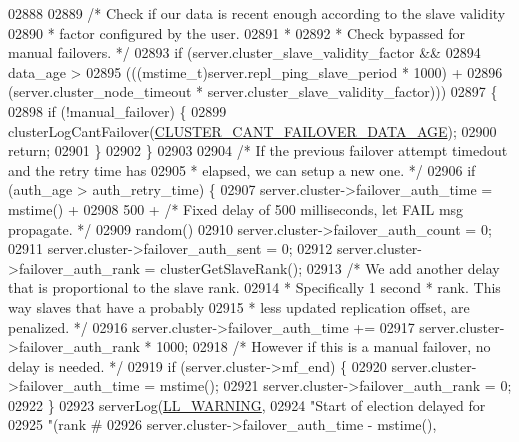 \begin{DoxyCode}
{{{{{{{{{{{{{{{{{{{{{{{{{{{{{{{{{{{{{{{{{{{{{{{{{{{02888 
02889     \textcolor{comment}{/* Check if our data is recent enough according to the slave validity}
02890 \textcolor{comment}{     * factor configured by the user.}
02891 \textcolor{comment}{     *}
02892 \textcolor{comment}{     * Check bypassed for manual failovers. */}
02893     \textcolor{keywordflow}{if} (server.cluster\_slave\_validity\_factor &&
02894         data\_age >
02895         (((mstime\_t)server.repl\_ping\_slave\_period * 1000) +
02896          (server.cluster\_node\_timeout * server.cluster\_slave\_validity\_factor)))
02897     \{
02898         \textcolor{keywordflow}{if} (!manual\_failover) \{
02899             clusterLogCantFailover(\hyperlink{cluster_8h_a0ad102e4aecc3451096624e2201f4285}{CLUSTER\_CANT\_FAILOVER\_DATA\_AGE});
02900             \textcolor{keywordflow}{return};
02901         \}
02902     \}
02903 
02904     \textcolor{comment}{/* If the previous failover attempt timedout and the retry time has}
02905 \textcolor{comment}{     * elapsed, we can setup a new one. */}
02906     \textcolor{keywordflow}{if} (auth\_age > auth\_retry\_time) \{
02907         server.cluster->failover\_auth\_time = mstime() +
02908             500 + \textcolor{comment}{/* Fixed delay of 500 milliseconds, let FAIL msg propagate. */}
02909             random() %
02910         server.cluster->failover\_auth\_count = 0;
02911         server.cluster->failover\_auth\_sent = 0;
02912         server.cluster->failover\_auth\_rank = clusterGetSlaveRank();
02913         \textcolor{comment}{/* We add another delay that is proportional to the slave rank.}
02914 \textcolor{comment}{         * Specifically 1 second * rank. This way slaves that have a probably}
02915 \textcolor{comment}{         * less updated replication offset, are penalized. */}
02916         server.cluster->failover\_auth\_time +=
02917             server.cluster->failover\_auth\_rank * 1000;
02918         \textcolor{comment}{/* However if this is a manual failover, no delay is needed. */}
02919         \textcolor{keywordflow}{if} (server.cluster->mf\_end) \{
02920             server.cluster->failover\_auth\_time = mstime();
02921             server.cluster->failover\_auth\_rank = 0;
02922         \}
02923         serverLog(\hyperlink{server_8h_a31229b9334bba7d6be2a72970967a14b}{LL\_WARNING},
02924             \textcolor{stringliteral}{"Start of election delayed for %
02925             \textcolor{stringliteral}{"(rank #%
02926             server.cluster->failover\_auth\_time - mstime(),
}}}}}}}}}}}}}}}}}}}}}}}}}}}}}}}}}}}}}}}}}}}}}}}}}}}}}
\end{DoxyCode}
